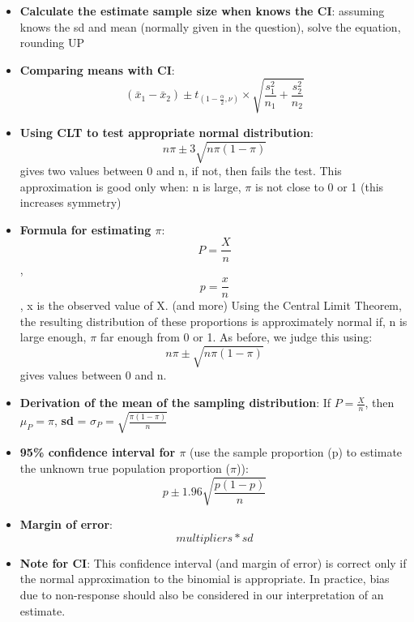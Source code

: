 \documentclass[12pt]{book}
\begin{document}
\begin{itemize}
\item \textbf{Calculate the estimate sample size when knows the CI}: assuming knows the sd and mean (normally given in the question), solve the equation, rounding UP
\item \textbf{Comparing means with CI}: $$(\bar{x}_1 - \bar{x}_2) \pm t_{(1-\frac{\alpha}{2}, \nu)} \times \sqrt{\frac{s_1^2}{n_1} + \frac{s_2^2}{n_2}}$$
\item \textbf{Using CLT to test appropriate normal distribution}: $$n\pi \pm 3 \sqrt{n\pi (1 - \pi)}$$
gives two values between 0 and n, if not, then fails the test. This approximation is good only when: n is large, $\pi$ is not close to 0 or 1 (this increases symmetry)
\item \textbf{Formula for estimating $\pi$}: $$P = \frac{X}{n}$$, $$p = \frac{x}{n}$$, x is the observed value of X. (and more) Using the Central Limit Theorem, the resulting distribution of these proportions is approximately normal if, n is large enough, $\pi$ far enough from 0 or 1. As before, we judge this using: $$n\pi \pm \sqrt{n\pi(1 - \pi)}$$ gives values between 0 and n.
\item \textbf{Derivation of the mean of the sampling distribution}: If \(P = \frac{X}{n}\), then \(\mu_P = \pi\), \textbf{sd} = \(\sigma_P = \sqrt{\frac{\pi(1 - \pi)}{n}}\)
\item \textbf{95\% confidence interval for $\pi$} (use the sample proportion (p) to estimate the unknown true population proportion ($\pi$)): $$p \pm 1.96 \sqrt{\frac{p(1 - p)}{n}}$$
\item \textbf{Margin of error}: $$multipliers * sd$$
\item \textbf{Note for CI}: This confidence interval (and margin of error) is correct only if the normal approximation to the binomial is appropriate. In practice, bias due to non-response should also be considered in our interpretation of an estimate.
\end{itemize}


\newpage

\pagestyle{fancy}
\end{document}
